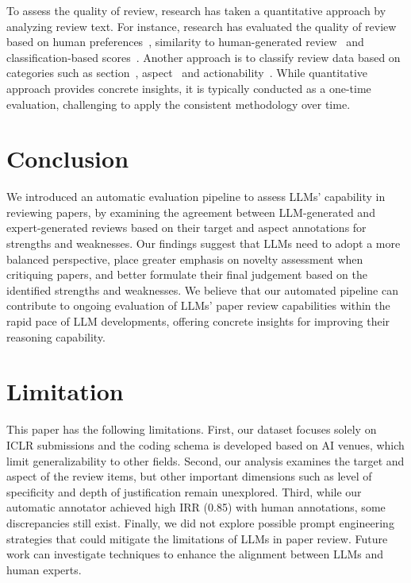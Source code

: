 To assess the quality of review, research has taken a quantitative approach by analyzing review text. For instance, research has evaluated the quality of review based on human preferences~\citep{tyser2024ai}, similarity to human-generated review~\citep{zhou2024llm, liang2024can, gao2024reviewer2optimizingreviewgeneration, Sun2024MetaWriterET, chamoun2024automated} and classification-based scores~\citep{Li2023SummarizingMD}. Another approach is to classify review data based on categories such as section~\citep{ghosal2022peer}, aspect~\citep{yuan2022can, chamoun2024automated, liang2024can} and actionability~\citep{Choudhary2022ReActAR}. While quantitative approach provides concrete insights, it is typically conducted as a one-time evaluation, challenging to apply the consistent methodology over time.

\section{Conclusion}

We introduced an automatic evaluation pipeline to assess LLMs' capability in reviewing papers, by examining the agreement between LLM-generated and expert-generated reviews based on their target and aspect annotations for strengths and weaknesses. Our findings suggest that LLMs need to adopt a more balanced perspective, place greater emphasis on novelty assessment when critiquing papers, and better formulate their final judgement based on the identified strengths and weaknesses. We believe that our automated pipeline can contribute to ongoing evaluation of LLMs' paper review capabilities within the rapid pace of LLM developments, offering concrete insights for improving their reasoning capability.

\section*{Limitation}

This paper has the following limitations. First, our dataset focuses solely on ICLR submissions and the coding schema is developed based on AI venues, which limit generalizability to other fields. Second, our analysis examines the target and aspect of the review items, but other important dimensions such as level of specificity and depth of justification remain unexplored. Third, while our automatic annotator achieved high IRR (0.85) with human annotations, some discrepancies still exist. Finally, we did not explore possible prompt engineering strategies that could mitigate the limitations of LLMs in paper review. Future work can investigate techniques to enhance the alignment between LLMs and human experts.

